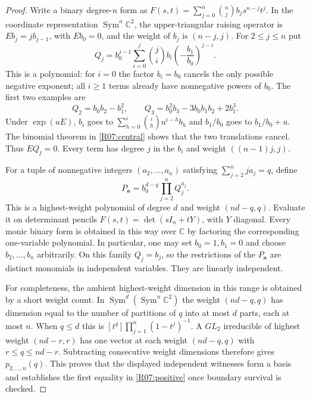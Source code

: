 \begin{proof}
Write a binary degree-$n$ form as
$F(s,t)=\sum_{j=0}^n\binom nj b_j s^{n-j}t^j$.
In the coordinate representation $\operatorname{Sym}^n\mathbb C^2$,
the upper-triangular raising operator is
$E b_j=j b_{j-1}$, with $E b_0=0$, and the weight of $b_j$ is
$(n-j,j)$. For $2\leq j\leq n$ put
\begin{equation}\label{R07:central}
 Q_j=b_0^{j-1}\sum_{i=0}^j\binom ji b_i
                  \left(-\frac{b_1}{b_0}\right)^{j-i}.
\end{equation}
This is a polynomial: for $i=0$ the factor $b_i=b_0$ cancels the only
possible negative exponent; all $i\geq1$ terms already have
nonnegative powers of $b_0$. The first two examples are
\[
 Q_2=b_0b_2-b_1^2,\qquad
 Q_3=b_0^2b_3-3b_0b_1b_2+2b_1^3.
\]
Under $\exp(uE)$, $b_i$ goes to
$\sum_{h=0}^i\binom ih u^{i-h}b_h$ and $b_1/b_0$ goes to
$b_1/b_0+u$. The binomial theorem in \eqref{R07:central} shows that
the two translations cancel. Thus $E Q_j=0$. Every term has degree
$j$ in the $b_i$ and weight $((n-1)j,j)$.

For a tuple of nonnegative integers $(a_2,\ldots,a_n)$ satisfying
$\sum_{j=2}^n ja_j=q$, define
\begin{equation}\label{R07:witness}
 P_{\mathbf a}=b_0^{d-q}\prod_{j=2}^n Q_j^{a_j}.
\end{equation}
This is a highest-weight polynomial of degree $d$ and weight
$(nd-q,q)$. Evaluate it on determinant pencils
$F(s,t)=\det(sI_n+tY)$, with $Y$ diagonal. Every monic binary form
is obtained in this way over $\mathbb C$ by factoring the corresponding
one-variable polynomial. In particular, one may set $b_0=1,b_1=0$
and choose $b_2,\ldots,b_n$ arbitrarily. On this family $Q_j=b_j$,
so the restrictions of the $P_{\mathbf a}$ are distinct monomials
in independent variables. They are linearly independent.

For completeness, the ambient highest-weight dimension in this range
is obtained by a short weight count. In
$\operatorname{Sym}^d(\operatorname{Sym}^n\mathbb C^2)$ the weight
$(nd-q,q)$ has dimension equal to the number of partitions of $q$
into at most $d$ parts, each at most $n$. When $q\leq d$ this is
$[t^q]\prod_{j=1}^n(1-t^j)^{-1}$. A $GL_2$ irreducible of highest
weight $(nd-r,r)$ has one vector at each weight $(nd-q,q)$ with
$r\leq q\leq nd-r$. Subtracting consecutive weight dimensions
therefore gives $p_{2,\ldots,n}(q)$. This proves that the displayed
independent witnesses form a basis and establishes the first equality
in \eqref{R07:positive} once boundary survival is checked.


\end{proof}
